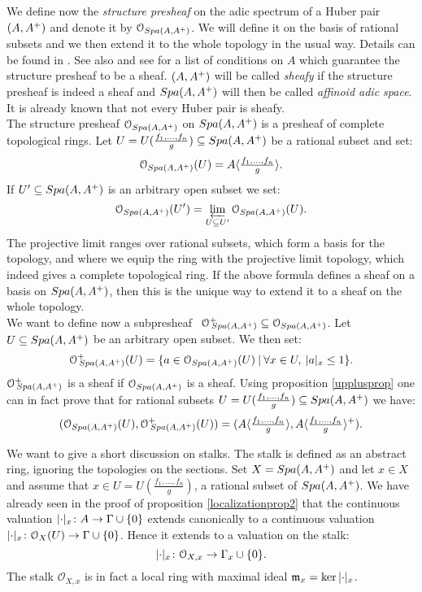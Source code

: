 We define now the \emph{structure presheaf} on the adic spectrum of a Huber pair $(A,A{^{+}})$  and denote it by $\mathcal{O}_{{Spa({A},{A{^{+}}})}}$. We will define it on the basis of rational subsets and we then extend it to the whole topology in the usual way.
Details can be found in \cite{Huber94}. See also \cite[chapter III.6]{Morel19} 
and see \cite[theorem IV.1.1.5]{Morel19} for a list of conditions 
on $A$ which guarantee the structure presheaf to be a sheaf. $(A,A{^{+}})$  will be called \emph{sheafy} if the structure presheaf is indeed a sheaf and ${Spa({A},{A{^{+}}})}$ will then be called \emph{affinoid adic space}. It is already known that not every Huber pair is sheafy.\\

The structure presheaf $\mathcal{O}_{{Spa({A},{A{^{+}}})}}$ on ${Spa({A},{A{^{+}}})}$ is a presheaf
of complete topological rings.
Let $U=U(\tfrac{f_1,\dots,f_n}{g})\subseteq{Spa({A},{A{^{+}}})}$ be a rational subset and 
set:
\[\mathcal{O}_{{Spa({A},{A{^{+}}})}}(U) = A\langle\tfrac{f_1,\dots,f_n}{g}\rangle.\]
If $U'\subseteq{Spa({A},{A{^{+}}})}$ is an arbitrary open subset we set:
\[\mathcal{O}_{{Spa({A},{A{^{+}}})}}(U') = \varprojlim_{U\subseteq U'}\mathcal{O}_{{Spa({A},{A{^{+}}})}}(U).\]
The projective limit ranges over rational subsets, which form a basis for the topology, and where we equip the ring with the projective limit topology, which indeed gives a complete topological ring. If the above formula defines a sheaf on a basis on ${Spa({A},{A{^{+}}})}$, then this is the unique way to extend it to a sheaf on the whole topology.\\

We want to define now a subpresheaf
$\:\:\mathcal{O}{^{+}}\!\!\!_{{Spa({A},{A{^{+}}})}}\subseteq\mathcal{O}_{{Spa({A},{A{^{+}}})}}$.
Let $U\subseteq{Spa({A},{A{^{+}}})}$ be an arbitrary open subset. We then set:
\[\mathcal{O}{^{+}}\!\!\!_{{Spa({A},{A{^{+}}})}}(U) = \{a\in\mathcal{O}_{{Spa({A},{A{^{+}}})}}(U) \:\vert\:\forall x\in U,\: \lvert a\rvert_{x}\leq 1\}.\]
$\mathcal{O}{^{+}}\!\!\!_{{Spa({A},{A{^{+}}})}}$ is a sheaf if $\mathcal{O}_{{Spa({A},{A{^{+}}})}}$ is a sheaf. Using proposition \ref{upplusprop} one can in fact prove that for rational subsets
$U=U(\tfrac{f_1,\dots,f_n}{g})\subseteq{Spa({A},{A{^{+}}})}$ we have:
\[(\mathcal{O}_{{Spa({A},{A{^{+}}})}}(U), \mathcal{O}{^{+}}\!\!\!_{{Spa({A},{A{^{+}}})}}(U)) = (A\langle\tfrac{f_1,\dots,f_n}{g}\rangle, A\langle\tfrac{f_1,\dots,f_n}{g}\rangle{^{+}}).\]

We want to give a short discussion on stalks. The stalk is defined as an abstract ring, ignoring the topologies on the sections. Set $X={Spa({A},{A{^{+}}})}$ and let $x\in X$ and assume that $x\in U=U(\tfrac{f_1,\dots,f_n}{g})$, a rational subset of ${Spa({A},{A{^{+}}})}$. We have already seen in the proof of proposition \ref{localizationprop2}
that the continuous valuation $\lvert\cdot\rvert_{x}\colon A\to\Gamma\cup\{0\}$ extends canonically to a continuous valuation $\lvert\cdot\rvert_{x}\colon \mathcal{O}_{X}(U)\to\Gamma\cup\{0\}$. Hence it extends to a valuation on the stalk:
\[\lvert\cdot\rvert_{x}\colon \mathcal{O}_{X,x}\to\Gamma_{x}\cup\{0\}.\]
The stalk $\mathcal{O}_{X,x}$  is in fact a local ring with maximal ideal
$\mathfrak{m}_x = \ker{\lvert\cdot\rvert_{x}}$.
